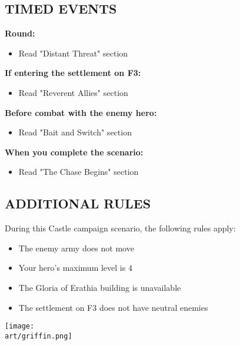 \newpage

\begin{multicols}{2}

\subsection*{\MakeUppercase{Timed Events}}

\textbf{ Round:}
\begin{itemize}
  \item Read "Distant Threat" section
\end{itemize}

\textbf{If entering the settlement on F3:}
\begin{itemize}
  \item Read "Reverent Allies" section
\end{itemize}

\textbf{Before combat with the enemy hero:}
\begin{itemize}
  \item Read "Bait and Switch" section
\end{itemize}

\textbf{When you complete the scenario:}
\begin{itemize}
  \item Read "The Chase Begins" section
\end{itemize}

\subsection*{\MakeUppercase{Additional rules}}

During this Castle campaign scenario, the following rules apply:

\begin{itemize}
  \item The enemy army does not move
  \item Your hero's maximum level is 4
  \item The Gloria of Erathia building is unavailable
  \item The settlement on F3 does not have neutral enemies
\end{itemize}

\columnbreak

\texttt{[image: \\art/griffin.png]}

\end{multicols}


